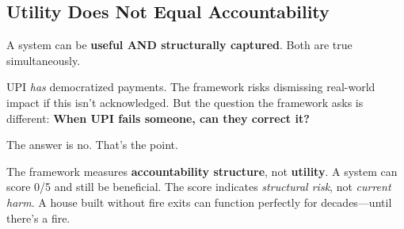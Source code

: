 \subsection{Utility Does Not Equal Accountability}
\label{subsec:utility}

A system can be \textbf{useful AND structurally captured}. Both are true simultaneously.

UPI \textit{has} democratized payments. The framework risks dismissing real-world impact if this isn't acknowledged. But the question the framework asks is different: \textbf{When UPI fails someone, can they correct it?}

The answer is no. That's the point.

The framework measures \textbf{accountability structure}, not \textbf{utility}. A system can score 0/5 and still be beneficial. The score indicates \textit{structural risk}, not \textit{current harm}. A house built without fire exits can function perfectly for decades---until there's a fire.